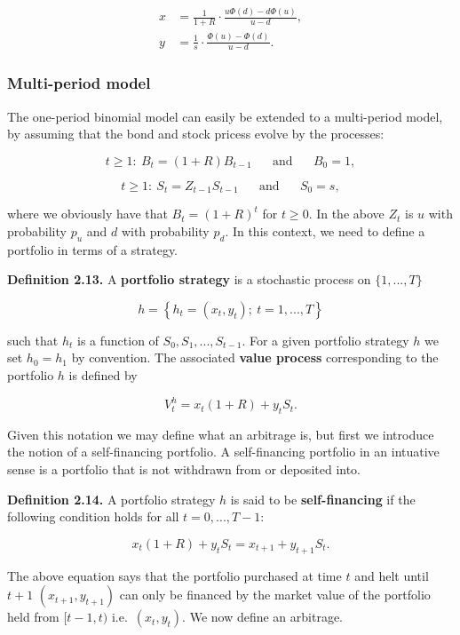 \documentclass[
]{article}
\begin{document}
\begin{align*}
x&=\frac{1}{1+R}\cdot\frac{u\Phi(d)-d\Phi(u)}{u-d},\tag{2.6}\\
y&=\frac{1}{s}\cdot\frac{\Phi(u)-\Phi(d)}{u-d}.\tag{2.7}
\end{align*}

\hypertarget{multi-period-model}{%
\subsubsection{Multi-period model}\label{multi-period-model}}

The one-period binomial model can easily be extended to a multi-period
model, by assuming that the bond and stock pricess evolve by the
processes:

\[
t\ge1:\ B_t=(1+R)B_{t-1}\hspace{20pt}\text{and}\hspace{20pt}B_0=1,
\]

\[
t\ge1:\ S_t=Z_{t-1}S_{t-1}\hspace{20pt}\text{and}\hspace{20pt}S_0=s,
\]

where we obviously have that \(B_t=(1+R)^t\) for \(t\ge 0\). In the
above \(Z_t\) is \(u\) with probability \(p_u\) and \(d\) with
probability \(p_d\). In this context, we need to define a portfolio in
terms of a strategy.

\textbf{Definition 2.13.} A \textbf{portfolio strategy} is a stochastic
process on \(\{1,...,T\}\)

\[
h=\left\{h_t=(x_t,y_t);\ t=1,...,T\right\}
\]

such that \(h_t\) is a function of \(S_0,S_1,...,S_{t-1}\). For a given
portfolio strategy \(h\) we set \(h_0=h_1\) by convention. The
associated \textbf{value process} corresponding to the portfolio \(h\)
is defined by

\[
V_t^h=x_t(1+R)+y_tS_t.
\]

Given this notation we may define what an arbitrage is, but first we
introduce the notion of a self-financing portfolio. A self-financing
portfolio in an intuative sense is a portfolio that is not withdrawn
from or deposited into.

\textbf{Definition 2.14.} A portfolio strategy \(h\) is said to be
\textbf{self-financing} if the following condition holds for all
\(t=0,...,T-1\):

\[
x_t(1+R)+y_tS_t=x_{t+1}+y_{t+1}S_t.
\]

The above equation says that the portfolio purchased at time \(t\) and
helt until \(t+1\) \((x_{t+1},y_{t+1})\) can only be financed by the
market value of the portfolio held from \([t-1,t)\)
i.e.~\((x_{t},y_{t})\). We now define an arbitrage.
\end{document}
